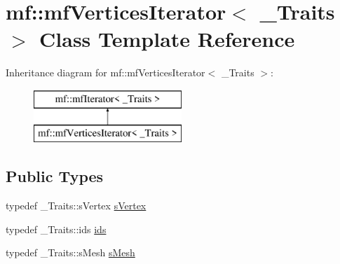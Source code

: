 \hypertarget{classmf_1_1mfVerticesIterator}{
\section{mf::mfVerticesIterator$<$ \_\-Traits $>$ Class Template Reference}
\label{classmf_1_1mfVerticesIterator}
}
Inheritance diagram for mf::mfVerticesIterator$<$ \_\-Traits $>$:\begin{figure}[H]
\begin{center}
\leavevmode
\includegraphics[height=2.000000cm]{classmf_1_1mfVerticesIterator}
\end{center}
\end{figure}
\subsection*{Public Types}
\begin{DoxyCompactItemize}
\item 
typedef \_\-Traits::sVertex \hyperlink{classmf_1_1mfVerticesIterator_a123ec8591eb79091da3c80bd1a3e2eca}{sVertex}
\item 
typedef \_\-Traits::ids \hyperlink{classmf_1_1mfVerticesIterator_a4d1c60d2572a77d4d5080b78c12a85f9}{ids}
\item 
typedef \_\-Traits::sMesh \hyperlink{classmf_1_1mfVerticesIterator_a351a7fef8c19f4cb57f4c0a68d337679}{sMesh}
\end{DoxyCompactItemize}
